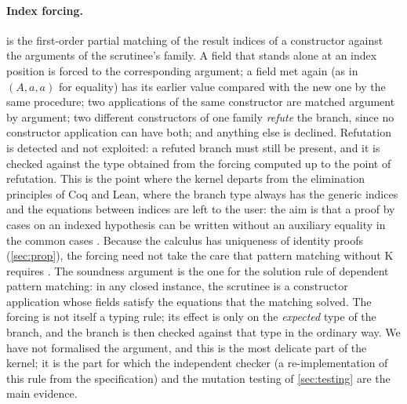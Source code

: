 \paragraph{Index forcing.}
 is the first-order partial matching of the result indices of a constructor against the arguments of the scrutinee's family.
A field that stands alone at an index position is forced to the corresponding argument; a field met again (as in $(A,a,a)$ for equality) has its earlier value compared with the new one by the same procedure; two applications of the same constructor are matched argument by argument; two different constructors of one family \emph{refute} the branch, since no constructor application can have both; and anything else is declined.
Refutation is detected and not exploited: a refuted branch must still be present, and it is checked against the type obtained from the forcing computed up to the point of refutation.
This is the point where the kernel departs from the elimination principles of Coq and Lean, where the branch type always has the generic indices and the equations between indices are left to the user: the aim is that a proof by cases on an indexed hypothesis can be written without an auxiliary equality in the common cases \citep{goguen06}.
Because the calculus has uniqueness of identity proofs (\cref{sec:prop}), the forcing need not take the care that pattern matching without K requires \citep{cockx14}.
The soundness argument is the one for the solution rule of dependent pattern matching: in any closed instance, the scrutinee is a constructor application whose fields satisfy the equations that the matching solved.
The forcing is not itself a typing rule; its effect is only on the \emph{expected} type of the branch, and the branch is then checked against that type in the ordinary way.
We have not formalised the argument, and this is the most delicate part of the kernel; it is the part for which the independent checker (a re-implementation of this rule from the specification) and the mutation testing of \cref{sec:testing} are the main evidence.

